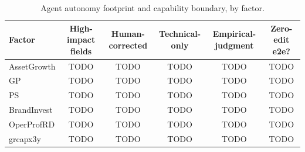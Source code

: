 \begin{table}[htbp]
  \centering
  \caption{Agent autonomy footprint and capability boundary, by factor.}
  \label{tab:autonomy}
  \begin{tabular}{lccccc}
    \toprule
    Factor & High-impact fields & Human-corrected & Technical-only & Empirical-judgment & Zero-edit e2e? \\
    \midrule
    AssetGrowth & TODO & TODO & TODO & TODO & TODO \\
    GP          & TODO & TODO & TODO & TODO & TODO \\
    PS          & TODO & TODO & TODO & TODO & TODO \\
    BrandInvest & TODO & TODO & TODO & TODO & TODO \\
    OperProfRD  & TODO & TODO & TODO & TODO & TODO \\
    grcapx3y    & TODO & TODO & TODO & TODO & TODO \\
    \bottomrule
  \end{tabular}
\end{table}
